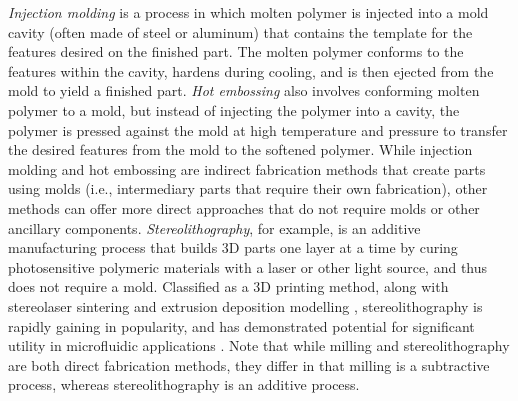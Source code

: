 \textit{Injection molding} is a process in which molten polymer is injected into a mold cavity (often made of steel or aluminum) that contains the template for the features desired on the finished part. The molten polymer conforms to the features within the cavity, hardens during cooling, and is then ejected from the mold to yield a finished part. \textit{Hot embossing} also involves conforming molten polymer to a mold, but instead of injecting the polymer into a cavity, the polymer is pressed against the mold at high temperature and pressure to transfer the desired features from the mold to the softened polymer. While injection molding and hot embossing are indirect fabrication methods that create parts using molds (i.e., intermediary parts that require their own fabrication), other methods can offer more direct approaches that do not require molds or other ancillary components. \textit{Stereolithography}, for example, is an additive manufacturing process that builds 3D parts one layer at a time by curing photosensitive polymeric materials with a laser or other light source, and thus does not require a mold. Classified as a 3D printing method, along with stereolaser sintering and extrusion deposition modelling \cite{Waldbaur2011}, stereolithography is rapidly gaining in popularity, and has demonstrated potential for significant utility in microfluidic applications \cite{Au2014,Morimoto2009, Bhargava2014}. Note that while milling and stereolithography are both direct fabrication methods, they differ in that milling is a subtractive process, whereas stereolithography is an additive process.

